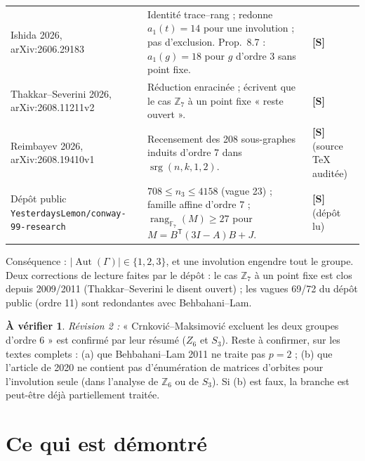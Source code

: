 \documentclass[11pt,a4paper]{article}
\theoremstyle{definition}
\newtheorem{verif}[theorem]{À vérifier}
\theoremstyle{remark}
\newcommand{\F}{\mathbb{F}}
\newcommand{\Z}{\mathbb{Z}}
\newcommand{\rg}{\operatorname{rang}}
\newcommand{\srg}{\operatorname{srg}}
\newcommand{\Aut}{\operatorname{Aut}}
\newcommand{\st}[1]{\textbf{[#1]}}
\newcommand{\code}[1]{\texttt{#1}}
\begin{document}
\begin{longtable}{p{4.6cm}p{7.6cm}p{2.6cm}}
Ishida 2026, arXiv:2606.29183 & Identité trace--rang ; redonne $a_1(t)=14$ pour une involution ; pas d'exclusion. Prop.~8.7 : $a_1(g)=18$ pour $g$ d'ordre 3 sans point fixe. & \st{S}\\
Thakkar--Severini 2026, arXiv:2608.11211v2 & Réduction enracinée ; écrivent que le cas $\Z_7$ à un point fixe « reste ouvert ». & \st{S}\\
Reimbayev 2026, arXiv:2608.19410v1 & Recensement des 208 sous-graphes induits d'ordre 7 dans $\srg(n,k,1,2)$. & \st{S} (source \TeX{} auditée)\\
Dépôt public \code{YesterdaysLemon/conway-99-research} & $708\le n_3\le4158$ (vague 23) ; famille affine d'ordre 7 ; $\rg_{\F_7}(M)\ge27$ pour $M=B^{\mathsf T}(3I-A)B+J$. & \st{S} (dépôt lu)\\
\bottomrule
\end{longtable}
Conséquence : $|\Aut(\Gamma)|\in\{1,2,3\}$, et une involution engendre tout le groupe.
Deux corrections de lecture faites par le dépôt : le cas $\Z_7$ à un point fixe est clos depuis 2009/2011 (Thakkar--Severini le disent ouvert) ; les vagues 69/72 du dépôt public (ordre 11) sont redondantes avec Behbahani--Lam.

\begin{verif}\label{ver:biblio}
\emph{Révision 2 :} « Crnković--Maksimović excluent les deux groupes d'ordre 6 » est confirmé par leur résumé ($Z_6$ et $S_3$). Reste à confirmer, sur les textes
complets : (a) que Behbahani--Lam 2011 ne traite pas $p=2$ ; (b) que l'article de 2020 ne contient pas d'énumération de matrices d'orbites pour l'involution seule
(dans l'analyse de $\Z_6$ ou de $S_3$). Si (b) est faux, la branche est peut-être déjà partiellement traitée.
\end{verif}

\section{Ce qui est démontré}\label{sec:demontre}
\end{document}
